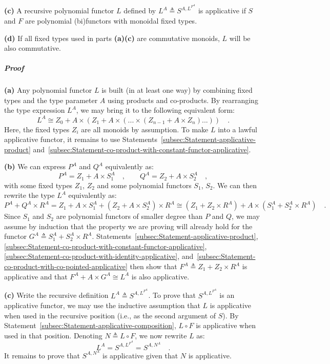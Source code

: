\textbf{(c)} A recursive polynomial functor $L$ defined by $L^{A}\triangleq S^{A,L^{F^{A}}}$
is applicative if $S$ and $F$ are polynomial (bi)functors with monoidal
fixed types.

\textbf{(d)} If all fixed types used in parts \textbf{(a)}\textendash \textbf{(c)}
are commutative monoids, $L$ will be also commutative.

\subparagraph{Proof}

\textbf{(a)} Any polynomial functor $L$ is built (in at least one
way) by combining fixed types and the type parameter $A$ using products
and co-products. By rearranging the type expression $L^{A}$, we may
bring it to the following equivalent form:
\[
L^{A}\cong Z_{0}+A\times(Z_{1}+A\times(...\times(Z_{n-1}+A\times Z_{n})...))\quad.
\]
Here, the fixed types $Z_{i}$ are all monoids by assumption. To make
$L$ into a lawful applicative functor, it remains to use Statements~\ref{subsec:Statement-applicative-product}
and~\ref{subsec:Statement-co-product-with-constant-functor-applicative}. 

\textbf{(b)} We can express $P^{A}$ and $Q^{A}$ equivalently as:
\[
P^{A}=Z_{1}+A\times S_{1}^{A}\quad,\quad\quad Q^{A}=Z_{2}+A\times S_{2}^{A}\quad,
\]
with some fixed types $Z_{1}$, $Z_{2}$ and some polynomial functors
$S_{1}$, $S_{2}$. We can then rewrite the type $L^{A}$ equivalently
as:
\[
P^{A}+Q^{A}\times R^{A}=Z_{1}+A\times S_{1}^{A}+(Z_{2}+A\times S_{2}^{A})\times R^{A}\cong(Z_{1}+Z_{2}\times R^{A})+A\times(S_{1}^{A}+S_{2}^{A}\times R^{A})\quad.
\]
Since $S_{1}$ and $S_{2}$ are polynomial functors of smaller degree
than $P$ and $Q$, we may assume by induction that the property we
are proving will already hold for the functor $G^{A}\triangleq S_{1}^{A}+S_{2}^{A}\times R^{A}$.
Statements~\ref{subsec:Statement-applicative-product}, \ref{subsec:Statement-co-product-with-constant-functor-applicative},
\ref{subsec:Statement-co-product-with-identity-applicative}, and~\ref{subsec:Statement-co-product-with-co-pointed-applicative}
then show that $F^{A}\triangleq Z_{1}+Z_{2}\times R^{A}$ is applicative
and that $F^{A}+A\times G^{A}\cong L^{A}$ is also applicative.

\textbf{(c)} Write the recursive definition $L^{A}\triangleq S^{A,L^{F^{A}}}$.
To prove that $S^{A,L^{F^{A}}}$ is an applicative functor, we may
use the inductive assumption that $L$ is applicative when used in
the recursive position (i.e., as the second argument of $S$). By
Statement~\ref{subsec:Statement-applicative-composition}, $L\circ F$
is applicative when used in that position. Denoting $N\triangleq L\circ F$,
we now rewrite $L$ as: 
\[
L^{A}=S^{A,L^{F^{A}}}=S^{A,N^{A}}\quad.
\]
It remains to prove that $S^{A,N^{A}}$ is applicative given that
$N$ is applicative. 

